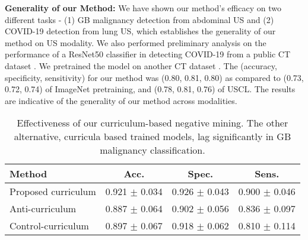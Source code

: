 \documentclass[runningheads]{llncs}
\newcommand{\myfirstpara}[1]{\par \noindent \textbf{#1:}}
\newcommand{\mypara}[1]{ \myfirstpara{#1}}
\begin{document}
\mypara{Generality of our Method} 
%
We have shown our method's efficacy on two different tasks - (1) GB malignancy detection from abdominal US and (2) COVID-19 detection from lung US, which establishes the generality of our method on US modality. We also performed preliminary analysis on the performance of a ResNet50 classifier in detecting COVID-19 from a public CT dataset \cite{cov-finetune}. We pretrained the model on another CT dataset \cite{cov-pretrain}. The (accuracy, specificity, sensitivity) for our method was (0.80, 0.81, 0.80) as compared to (0.73, 0.72, 0.74) of ImageNet pretraining, and (0.78, 0.81, 0.76) of USCL. The results are indicative of the generality of our method across modalities. 

\begin{table}[t]
	\centering
	\setlength{\tabcolsep}{10pt}
	\caption{Effectiveness of our curriculum-based negative mining. The other alternative, curricula based trained models, lag significantly in GB malignancy classification.}
	\begin{tabular}{lccc}
		\toprule
		\textbf{Method}	& \textbf{Acc.} & \textbf{Spec.} & \textbf{Sens.} \\
		\midrule
		Proposed curriculum & 0.921 $\pm$ 0.034 & 0.926 $\pm$ 0.043 & 0.900 $\pm$ 0.046 \\
		Anti-curriculum & 0.887 $\pm$ 0.064 & 0.902 $\pm$ 0.056 & 0.836 $\pm$ 0.097 \\
		Control-curriculum & 0.897 $\pm$ 0.067 & 0.918 $\pm$ 0.062 & 0.810 $\pm$ 0.114 \\
		\bottomrule
	\end{tabular}
	\label{tab:ablation_curriculum}
\end{table}
\end{document}
